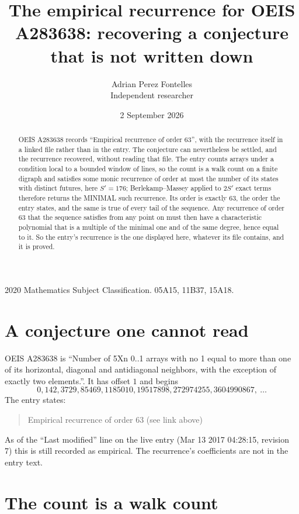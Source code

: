 \documentclass[11pt,a4paper]{article}
\title{The empirical recurrence for OEIS A283638: recovering a conjecture that is not written down}
\author{Adrian Perez Fontelles\\ \small Independent researcher}
\date{2 September 2026}
\theoremstyle{plain}
\theoremstyle{definition}
\begin{document}
\maketitle

\begin{abstract}
OEIS A283638 records ``Empirical recurrence of order $63$'', with the recurrence itself in a
linked file rather than in the entry. The conjecture can nevertheless be settled, and the
recurrence recovered, without reading that file. The entry counts arrays under a condition
local to a bounded window of lines, so the count is a walk count on a finite digraph and
satisfies some monic recurrence of order at most the number of its states with distinct
futures, here $S'=176$; Berlekamp--Massey applied to $2S'$ exact
terms therefore returns the MINIMAL such recurrence. Its order is exactly $63$, the order
the entry states, and the same is true of every tail of the sequence. Any recurrence of order
$63$ that the sequence satisfies from any point on must then have a characteristic
polynomial that is a multiple of the minimal one and of the same degree, hence equal to it. So
the entry's recurrence is the one displayed here, whatever its file contains, and it is
proved.
\end{abstract}

\noindent\small 2020 Mathematics Subject Classification. 05A15, 11B37, 15A18.\normalsize

\section{A conjecture one cannot read}

OEIS A283638 is ``Number of 5Xn 0..1 arrays with no 1 equal to more than one of its horizontal, diagonal and antidiagonal neighbors, with the exception of exactly two elements.''. It has offset $1$ and begins
\[
0, 142, 3729, 85469, 1185010, 19517898, 272974255, 3604990867,\ \dots
\]
The entry states:
\begin{quote}
Empirical recurrence of order 63 (see link above)
\end{quote}
As of the ``Last modified'' line on the live entry (Mar 13 2017 04:28:15, revision 7) this is still
recorded as empirical. The recurrence's coefficients are not in the entry text.

\section{The count is a walk count}
\end{document}
